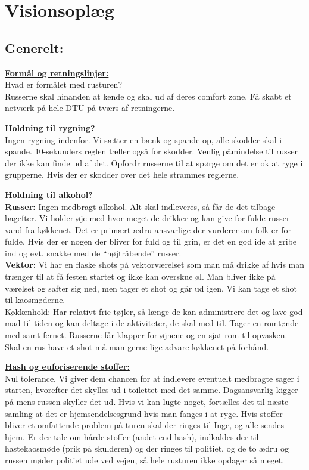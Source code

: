 \section{Visionsoplæg}
\subsection*{Generelt:}
\underline{\textbf{Formål og retningslinjer:}}\\
Hvad er formålet med rusturen?\\
Russerne skal hinanden at kende og skal ud af deres comfort zone. Få skabt et netværk på hele DTU på tværs af retningerne. 

\underline{\textbf{Holdning til rygning?}}\\
Ingen rygning indenfor. Vi sætter en bænk og spande op, alle skodder skal i spande. 10-sekunders reglen tæller også for skodder. Venlig påmindelse til russer der ikke kan finde ud af det. Opfordr russerne til at spørge om det er ok at ryge i grupperne. Hvis der er skodder over det hele strammes reglerne. 

\underline{\textbf{Holdning til alkohol?}}\\
\textbf{Russer:} Ingen medbragt alkohol. Alt skal indleveres, så får de det tilbage bagefter. Vi holder øje med hvor meget de drikker og kan give for fulde russer vand fra køkkenet. Det er primært ædru-ansvarlige der vurderer om folk er for fulde. Hvis der er nogen der bliver for fuld og til grin, er det en god ide at gribe ind og evt. snakke med de ``højtråbende'' russer.\\
\textbf{Vektor:} Vi har en flaske shots på vektorværelset som man må drikke af hvis man trænger til at få festen startet og ikke kan overskue øl. Man bliver ikke på værelset og safter sig ned, men tager et shot og går ud igen. Vi kan tage et shot til kaosmøderne.\\
Køkkenhold: Har relativt frie tøjler, så længe de kan administrere det og lave god mad til tiden og kan deltage i de aktiviteter, de skal med til. Tager en romtønde med samt fernet. Russerne får klapper for øjnene og en sjat rom til opvasken. Skal en rus have et shot må man gerne lige advare køkkenet på forhånd.

\underline{\textbf{Hash og euforiserende stoffer:}}\\
Nul tolerance. Vi giver dem chancen for at indlevere eventuelt medbragte sager i starten, hvorefter det skylles ud i toilettet med det samme. Dagsansvarlig kigger på mens russen skyller det ud. Hvis vi kan lugte noget, fortælles det til næste samling at det er hjemsendelsesgrund hvis man fanges i at ryge. Hvis stoffer bliver et omfattende problem på turen skal der ringes til Inge, og alle sendes hjem. Er der tale om hårde stoffer (andet end hash), indkaldes der til hastekaosmøde (prik på skulderen) og der ringes til politiet, og de to ædru og russen møder politiet ude ved vejen, så hele rusturen ikke opdager så meget.


